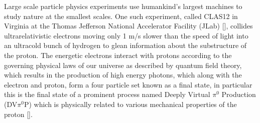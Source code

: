\documentclass{article}
\begin{document}
\linenumbers

\quad Large scale particle physics experiments use humankind's largest machines to study nature at the smallest scales. One such experiment, called CLAS12 in Virginia at the Thomas Jefferson National Accelerator Facility (JLab) [\citet{BURKERT2020163419}], collides ultrarelativistic electrons moving only 1 m/s slower than the speed of light into an ultracold bunch of hydrogen to glean information about the substructure of the proton. The energetic electrons interact with protons according to the governing physical laws of our universe as described by quantum field theory, which results in the production of high energy photons, which along with the electron and proton, form a four particle set known as a final state, in particular this is the final state of a prominent process named Deeply Virtual $\pi^0$ Production (DV$\pi^0$P) which is physically related to various mechanical properties of the proton [\citet{PhysRevD.55.7114}]. 
\end{document}
